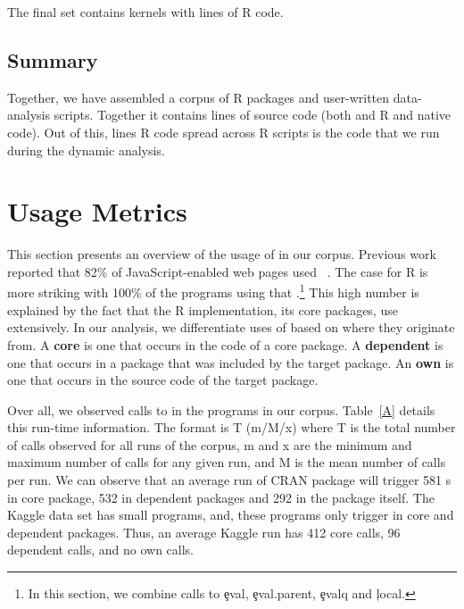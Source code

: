 \documentclass[conference]{IEEEtran}
\begin{document}
The final set contains \CorpusFinishedKaggle kernels with
 lines of R code.

\subsection{Summary}

Together, we have assembled a corpus of \CorpusPackages R packages and
\CorpusFinishedKaggle user-written data-analysis scripts. Together it contains
\CorpusAllCodeRnd lines of source code (both and R and native code). Out of
this, \CorpusAllRunnbaleCode lines R code spread across \CorpusAllPrograms R
scripts is the code that we run during the dynamic analysis.

\section{Usage Metrics}

This section presents an overview of the usage of \eval in our corpus.
Previous work reported that 82\% of JavaScript-enabled web pages used
\eval~\cite{ecoop11}. The case for R is more striking with 100\% of the
programs using that \eval.\footnote{In this section, we combine calls to
  \c{eval}, \c{eval.parent}, \c{evalq} and \c{local}.}  This high number is
explained by the fact that the R implementation, its core packages, use
\eval extensively. In our analysis, we differentiate uses of \eval based on
where they originate from. A {\bf core} \eval is one that occurs in the code
of a core package.  A {\bf dependent} \eval is one that occurs in a package
that was included by the target package. An {\bf own} \eval is one that
occurs in the source code of the target package.

Over all, we observed \AllAllCallCountRnd calls to \eval in the
\CorpusAllProgramsRnd programs in our corpus.  Table~\ref{A} details this
run-time information. The format is T (m/M/x) where T is the total number of
calls observed for all runs of the corpus, m and x are the minimum and
maximum number of calls for any given run, and M is the mean number of calls
per run. We can observe that an average run of CRAN package will trigger 581
{\eval}s in core package, 532 in dependent packages and 292 in the package
itself.  The Kaggle data set has small programs, and, these programs only
trigger \eval in core and dependent packages. Thus, an average Kaggle run
has 412 core calls, 96 dependent calls, and no own calls.
\end{document}
